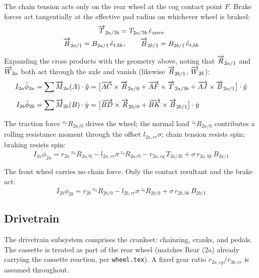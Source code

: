 \begin{aiblock}
The chain tension acts only on the rear wheel at the cog contact point $F$. Brake forces act tangentially at the effective pad radius on whichever wheel is braked:
\begin{gather}
    \overrightarrow{T}_{2a/3b} = T_{2a/3b}\,\hat{e}_{span} \\
    \overrightarrow{B}_{2a/1} = B_{2a/1}\,\hat{e}_{t,bk}, \qquad \overrightarrow{B}_{2b/1} = B_{2b/1}\,\hat{e}_{t,bk}
\end{gather}

Expanding the cross products with the geometry above, noting that $\overrightarrow{R}_{2a/1}$ and $\overrightarrow{W}_{2a}$ both act through the axle and vanish (likewise $\overrightarrow{R}_{2b/1}$, $\overrightarrow{W}_{2b}$):
\begin{align}
    I_{2a}\ddot{\phi}_{2a} &= \sum \overrightarrow{M}_{2a}(A)\cdot\hat{y}
        = \bigl[\overrightarrow{AC}\times\overrightarrow{R}_{2a/0} + \overrightarrow{AF}\times\overrightarrow{T}_{2a/3b}
          + \overrightarrow{AJ}\times\overrightarrow{B}_{2a/1}\bigr]\cdot\hat{y} \\[6pt]
    I_{2b}\ddot{\phi}_{2b} &= \sum \overrightarrow{M}_{2b}(B)\cdot\hat{y}
        = \bigl[\overrightarrow{BD}\times\overrightarrow{R}_{2b/0}
          + \overrightarrow{BK}\times\overrightarrow{B}_{2b/1}\bigr]\cdot\hat{y}
\end{align}

The traction force ${}^{x_0}R_{2a/0}$ drives the wheel; the normal load ${}^{z_0}R_{2a/0}$ contributes a rolling resistance moment through the offset $l_{2a,rr}\sigma$; chain tension resists spin; braking resists spin:
\begin{equation}
    I_{2a}\ddot{\phi}_{2a} = r_{2a}\,{}^{x_0}R_{2a/0} - l_{2a,rr}\sigma\,{}^{z_0}R_{2a/0}
        - r_{2a,cg}\,T_{2a/3b} + \sigma\,r_{2a,bk}\,B_{2a/1}
\end{equation}

The front wheel carries no chain force. Only the contact resultant and the brake act:
\begin{equation}
    I_{2b}\ddot{\phi}_{2b} = r_{2b}\,{}^{x_0}R_{2b/0} - l_{2b,rr}\sigma\,{}^{z_0}R_{2b/0}
        + \sigma\,r_{2b,bk}\,B_{2b/1}
\end{equation}

\subsection{Drivetrain}
The drivetrain subsystem comprises the crankset: chainring, cranks, and pedals. The cassette is treated as part of the rear wheel (matches Rear (2a) already carrying the cassette reaction, per \texttt{wheel.tex}). A fixed gear ratio $r_{2a,cg}/r_{3b,cr}$ is assumed throughout.


\end{aiblock}
